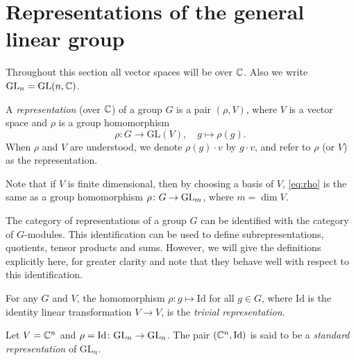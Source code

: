 \documentclass[11pt]{amsart}
\begin{document}
\section{Representations of the general linear group}\label{sec:repGLn}

Throughout this section all vector spaces will be over \(\mathbb{C}\). Also we write \(\mathrm{GL}_n = \mathrm{GL}(n,\mathbb{C})\).

\begin{defin}\label{def:rep}
    A \emph{representation} (over \(\mathbb{C}\)) of a group $G$ is a pair $(\rho, V)$, where $V$ is a vector space and $\rho$ is a group homomorphism 
    \begin{equation}
        \rho\colon G \longrightarrow \mathrm{GL}(V), \quad g \longmapsto \rho(g).  \label{eq:rho}
    \end{equation}
    When $\rho$ and $V$ are understood, we denote $\rho(g) \cdot v$ by $g \cdot v$, and refer to $\rho$ (or $V$) as the representation. 
\end{defin}

Note that if $V$ is finite dimensional, then by choosing a basis of \(V\), \cref{eq:rho} is the same as a group homomorphism \(\rho \colon G \rightarrow \mathrm{GL}_m \), where \(m = \dim V\). 

\begin{rem}
    The category of representations of a group $G$ can be identified with the category of $G$-modules. This identification can be used to define subrepresentations, quotients, tensor products and sums. However, we will give the definitions explicitly here, for greater clarity and note that they behave well with respect to this identification. 
\end{rem}

\begin{eg} \leavevmode
\begin{enum}
    \item For any $G$ and $V$, the homomorphism $\rho: g \mapsto \mathrm{Id}$ for all $g \in G$, where $\mathrm{Id}$ is the identity linear transformation $V \to V$, is the \emph{trivial representation}.
    \item Let $V = \mathbb{C}^n$ and $\rho = \mathrm{Id} \colon \mathrm{GL}_n \rightarrow \mathrm{GL}_n $. The pair $(\mathbb{C}^n, \mathrm{Id})$ is said to be a \emph{standard representation} of $\mathrm{GL}_n$.
\end{enum}
\end{eg}
\end{document}
